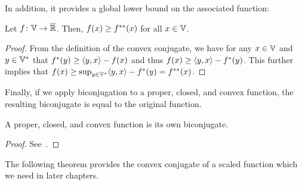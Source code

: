 \begin{sidefigure}
		\caption[%
			The one-norm on and its convex conjugate%
		]{%
			The one-norm \( \norm{}_{1} \) on \( \R^{\num{2}} \) (top) and its convex conjugate \( \IndicatorFunction{\norm{}_{\infty} \leq 1} \).
		}%
		\label{fig:convex conjugate one norm}
\end{sidefigure}
In addition, it provides a global lower bound on the associated function:
\begin{lemma}
	Let \( f \colon \mathbb{V} \to \overline{\mathbb{R}} \).
	Then, \( f(x) \geq f^{\ast\ast}(x) \) for all \( x \in \mathbb{V} \).
\end{lemma}
\begin{proof}
	From the definition of the convex conjugate, we have for any \( x \in \mathbb{V} \) and \( y \in \mathbb{V}^{\ast} \) that \( f^{\ast}(y)\geq\langle y, x \rangle-f(x) \) and thus \( f(x) \geq \langle y, x \rangle-f^{\ast}(y) \).
	This further implies that \( f(x) \geq \sup_{y\in\mathbb{V}^{\ast}}\langle y, x \rangle-f^{\ast}(y)=f^{\ast\ast}(x) \).
\end{proof}
Finally, if we apply biconjugation to a proper, closed, and convex function, the resulting biconjugate is equal to the original function.
\begin{theorem}%
	\label{th:biconjugate of convex function is itself}
	A proper, closed, and convex function is its own biconjugate.
\end{theorem}
\begin{proof}
	See~\cite[page 104]{Rockafellar+1970}.
\end{proof}
The following theorem provides the convex conjugate of a scaled function which we need in later chapters.
